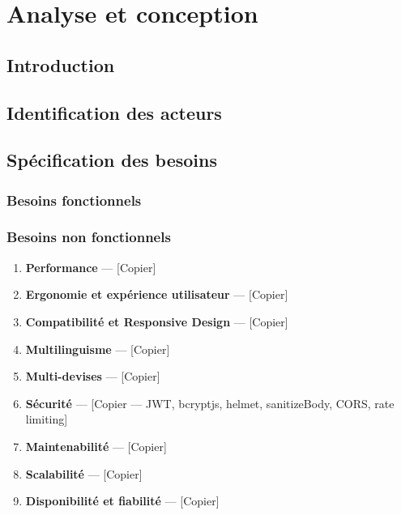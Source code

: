\chapter{Analyse et conception}

\section*{Introduction}

\section{Identification des acteurs}

\section{Spécification des besoins}

\subsection{Besoins fonctionnels}

\subsection{Besoins non fonctionnels}

\begin{enumerate}
  \item \textbf{Performance} — [Copier]
  \item \textbf{Ergonomie et expérience utilisateur} — [Copier]
  \item \textbf{Compatibilité et Responsive Design} — [Copier]
  \item \textbf{Multilinguisme} — [Copier]
  \item \textbf{Multi-devises} — [Copier]
  \item \textbf{Sécurité} — [Copier — JWT, bcryptjs, helmet, sanitizeBody, CORS, rate limiting]
  \item \textbf{Maintenabilité} — [Copier]
  \item \textbf{Scalabilité} — [Copier]
  \item \textbf{Disponibilité et fiabilité} — [Copier]
\end{enumerate}

